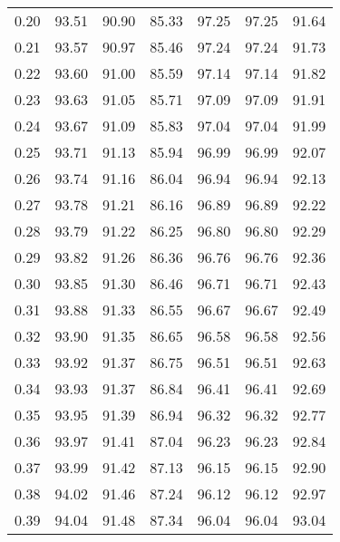 \begin{tabular}{|c|c|c|c|c|c|c|}
      0.20 &     93.51 &     90.90 &      85.33 &   97.25 &      97.25 &         91.64 \\
      0.21 &     93.57 &     90.97 &      85.46 &   97.24 &      97.24 &         91.73 \\
      0.22 &     93.60 &     91.00 &      85.59 &   97.14 &      97.14 &         91.82 \\
      0.23 &     93.63 &     91.05 &      85.71 &   97.09 &      97.09 &         91.91 \\
      0.24 &     93.67 &     91.09 &      85.83 &   97.04 &      97.04 &         91.99 \\
      0.25 &     93.71 &     91.13 &      85.94 &   96.99 &      96.99 &         92.07 \\
      0.26 &     93.74 &     91.16 &      86.04 &   96.94 &      96.94 &         92.13 \\
      0.27 &     93.78 &     91.21 &      86.16 &   96.89 &      96.89 &         92.22 \\
      0.28 &     93.79 &     91.22 &      86.25 &   96.80 &      96.80 &         92.29 \\
      0.29 &     93.82 &     91.26 &      86.36 &   96.76 &      96.76 &         92.36 \\
      0.30 &     93.85 &     91.30 &      86.46 &   96.71 &      96.71 &         92.43 \\
      0.31 &     93.88 &     91.33 &      86.55 &   96.67 &      96.67 &         92.49 \\
      0.32 &     93.90 &     91.35 &      86.65 &   96.58 &      96.58 &         92.56 \\
      0.33 &     93.92 &     91.37 &      86.75 &   96.51 &      96.51 &         92.63 \\
      0.34 &     93.93 &     91.37 &      86.84 &   96.41 &      96.41 &         92.69 \\
      0.35 &     93.95 &     91.39 &      86.94 &   96.32 &      96.32 &         92.77 \\
      0.36 &     93.97 &     91.41 &      87.04 &   96.23 &      96.23 &         92.84 \\
      0.37 &     93.99 &     91.42 &      87.13 &   96.15 &      96.15 &         92.90 \\
      0.38 &     94.02 &     91.46 &      87.24 &   96.12 &      96.12 &         92.97 \\
      0.39 &     94.04 &     91.48 &      87.34 &   96.04 &      96.04 &         93.04 \\

\end{tabular}

